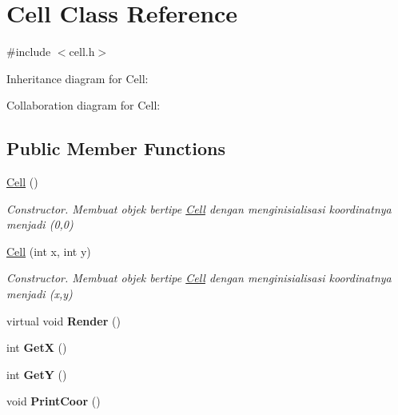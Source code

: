 \hypertarget{classCell}{}\section{Cell Class Reference}
\label{classCell}


{\ttfamily \#include $<$cell.\+h$>$}



Inheritance diagram for Cell\+:


Collaboration diagram for Cell\+:
\subsection*{Public Member Functions}
\begin{DoxyCompactItemize}
\item 
\hyperlink{classCell_a394510643e8664cf12b5efaf5cb99f71}{Cell} ()\hypertarget{classCell_a394510643e8664cf12b5efaf5cb99f71}{}\label{classCell_a394510643e8664cf12b5efaf5cb99f71}

\begin{DoxyCompactList}\small\item\em Constructor. Membuat objek bertipe \hyperlink{classCell}{Cell} dengan menginisialisasi koordinatnya menjadi (0,0) \end{DoxyCompactList}\item 
\hyperlink{classCell_aa39ad04eeebb7bf00d592ad36640337e}{Cell} (int x, int y)
\begin{DoxyCompactList}\small\item\em Constructor. Membuat objek bertipe \hyperlink{classCell}{Cell} dengan menginisialisasi koordinatnya menjadi (x,y) \end{DoxyCompactList}\item 
virtual void {\bfseries Render} ()\hypertarget{classCell_a6abd6c362b1b97636dd55ba46609c873}{}\label{classCell_a6abd6c362b1b97636dd55ba46609c873}

\item 
int {\bfseries GetX} ()\hypertarget{classCell_a91e44d6a6b1b4ac59babaec3cb99ea66}{}\label{classCell_a91e44d6a6b1b4ac59babaec3cb99ea66}

\item 
int {\bfseries GetY} ()\hypertarget{classCell_a67badd925fbe193a1a29557c1917e00f}{}\label{classCell_a67badd925fbe193a1a29557c1917e00f}

\item 
void {\bfseries Print\+Coor} ()\hypertarget{classCell_aa141d39d8d58d93b54486f4294de903d}{}\label{classCell_aa141d39d8d58d93b54486f4294de903d}

\end{DoxyCompactItemize}
